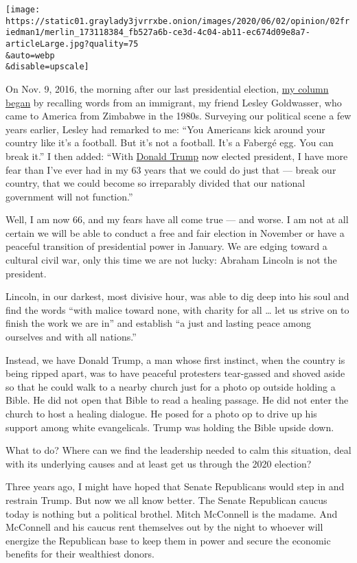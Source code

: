 \texttt{[image: https://static01.graylady3jvrrxbe.onion/images/2020/06/02/opinion/02friedman1/merlin\_173118384\_fb527a6b-ce3d-4c04-ab11-ec674d09e8a7-articleLarge.jpg?quality=75\\\&auto=webp\\\&disable=upscale]}

On Nov. 9, 2016, the morning after our last presidential election,
\href{https://www.nytimes3xbfgragh.onion/2016/11/09/opinion/were-near-the-breaking-point.html}{my
column began} by recalling words from an immigrant, my friend Lesley
Goldwasser, who came to America from Zimbabwe in the 1980s. Surveying
our political scene a few years earlier, Lesley had remarked to me:
``You Americans kick around your country like it's a football. But it's
not a football. It's a Fabergé egg. You can break it.'' I then added:
``With
\href{https://www.nytimes3xbfgragh.onion/2020/06/04/world/americas/trump-george-floyd.html}{Donald
Trump} now elected president, I have more fear than I've ever had in my
63 years that we could do just that --- break our country, that we could
become so irreparably divided that our national government will not
function.''

Well, I am now 66, and my fears have all come true --- and worse. I am
not at all certain we will be able to conduct a free and fair election
in November or have a peaceful transition of presidential power in
January. We are edging toward a cultural civil war, only this time we
are not lucky: Abraham Lincoln is not the president.

Lincoln, in our darkest, most divisive hour, was able to dig deep into
his soul and find the words ``with malice toward none, with charity for
all \ldots{} let us strive on to finish the work we are in'' and
establish ``a just and lasting peace among ourselves and with all
nations.''

Instead, we have Donald Trump, a man whose first instinct, when the
country is being ripped apart, was to have peaceful protesters
tear-gassed and shoved aside so that he could walk to a nearby church
just for a photo op outside holding a Bible. He did not open that Bible
to read a healing passage. He did not enter the church to host a healing
dialogue. He posed for a photo op to drive up his support among white
evangelicals. Trump was holding the Bible upside down.

What to do? Where can we find the leadership needed to calm this
situation, deal with its underlying causes and at least get us through
the 2020 election?

Three years ago, I might have hoped that Senate Republicans would step
in and restrain Trump. But now we all know better. The Senate Republican
caucus today is nothing but a political brothel. Mitch McConnell is the
madame. And McConnell and his caucus rent themselves out by the night to
whoever will energize the Republican base to keep them in power and
secure the economic benefits for their wealthiest donors.

